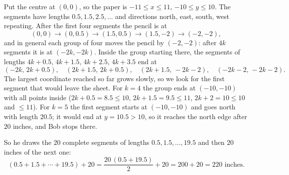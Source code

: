 Put the centre at $(0,0)$, so the paper is $-11\le x\le11$, $-10\le y\le10$. The segments have lengths $0.5,1.5,2.5,\dots$ and directions north, east, south, west repeating. After the first four segments the pencil is at
\[
(0,0)\to(0,0.5)\to(1.5,0.5)\to(1.5,-2)\to(-2,-2),
\]
and in general each group of four moves the pencil by $(-2,-2)$: after $4k$ segments it is at $(-2k,-2k)$. Inside the group starting there, the segments of lengths $4k+0.5$, $4k+1.5$, $4k+2.5$, $4k+3.5$ end at
\[
(-2k,\,2k+0.5),\quad(2k+1.5,\,2k+0.5),\quad(2k+1.5,\,-2k-2),\quad(-2k-2,\,-2k-2).
\]
The largest coordinate reached so far grows slowly, so we look for the first segment that would leave the sheet. For $k=4$ the group ends at $(-10,-10)$ with all points inside ($2k+0.5=8.5\le10$, $2k+1.5=9.5\le11$, $2k+2=10\le10$ and $\le11$). For $k=5$ the first segment starts at $(-10,-10)$ and goes north with length $20.5$; it would end at $y=10.5>10$, so it reaches the north edge after $20$ inches, and Bob stops there.

So he draws the $20$ complete segments of lengths $0.5,1.5,\dots,19.5$ and then $20$ inches of the next one:
\[
(0.5+1.5+\cdots+19.5)+20=\dfrac{20\,(0.5+19.5)}{2}+20=200+20=\boxed{220}\text{ inches}.
\]
